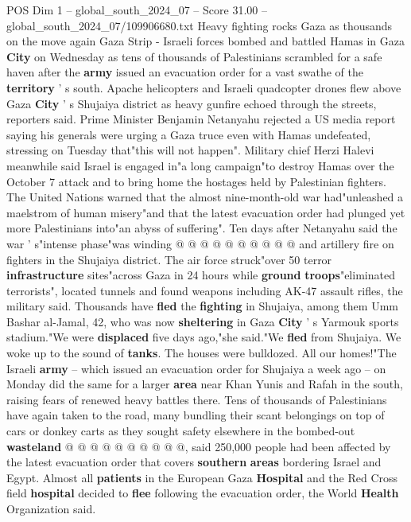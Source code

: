 \begin{textsample}{POS Dim 1 – global\_south\_2024\_07 – Score 31.00 – global\_south\_2024\_07/109906680.txt}  \label{ex:f1_pos_177}
Heavy fighting rocks Gaza as thousands on the move again Gaza Strip - Israeli forces bombed and battled Hamas in Gaza \textbf{City} on Wednesday as tens of thousands of Palestinians scrambled for a safe haven after the \textbf{army} issued an evacuation order for a vast swathe of the \textbf{territory} ' s south.
Apache helicopters and Israeli quadcopter drones flew above Gaza \textbf{City} ' s Shujaiya district as heavy gunfire echoed through the streets, reporters said.
Prime Minister Benjamin Netanyahu rejected a US media report saying his generals were urging a Gaza truce even with Hamas undefeated, stressing on Tuesday that"this will not happen".
Military chief Herzi Halevi meanwhile said Israel is engaged in"a long campaign"to destroy Hamas over the October 7 attack and to bring home the hostages held by Palestinian fighters.
The United Nations warned that the almost nine-month-old war had"unleashed a maelstrom of human misery"and that the latest evacuation order had plunged yet more Palestinians into"an abyss of suffering".
Ten days after Netanyahu said the war ' s"intense phase"was winding @ @ @ @ @ @ @ @ @ @ and artillery fire on fighters in the Shujaiya district.
The air force struck"over 50 terror \textbf{infrastructure} sites"across Gaza in 24 hours while \textbf{ground} \textbf{troops}"eliminated terrorists", located tunnels and found weapons including AK-47 assault rifles, the military said.
Thousands have \textbf{fled} the \textbf{fighting} in Shujaiya, among them Umm Bashar al-Jamal, 42, who was now \textbf{sheltering} in Gaza \textbf{City} ' s Yarmouk sports stadium."We were \textbf{displaced} five days ago,"she said."We \textbf{fled} from Shujaiya.
We woke up to the sound of \textbf{tanks}.
The houses were bulldozed.
All our homes!"The Israeli \textbf{army} -- which issued an evacuation order for Shujaiya a week ago -- on Monday did the same for a larger \textbf{area} near Khan Yunis and Rafah in the south, raising fears of renewed heavy battles there.
Tens of thousands of Palestinians have again taken to the road, many bundling their scant belongings on top of cars or donkey carts as they sought safety elsewhere in the bombed-out \textbf{wasteland} @ @ @ @ @ @ @ @ @ @, said 250,000 people had been affected by the latest evacuation order that covers \textbf{southern} \textbf{areas} bordering Israel and Egypt.
Almost all \textbf{patients} in the European Gaza \textbf{Hospital} and the Red Cross field \textbf{hospital} decided to \textbf{flee} following the evacuation order, the World \textbf{Health} Organization said.

\end{textsample}
